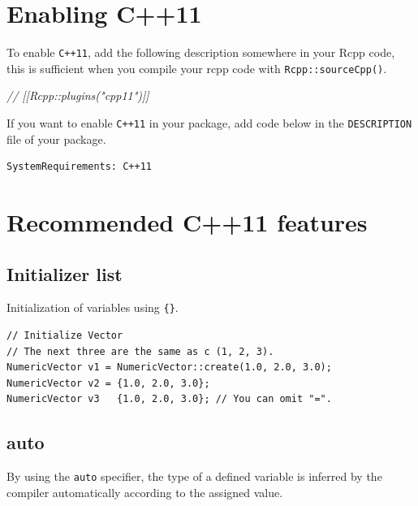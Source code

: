 \documentclass[]{book}
\newenvironment{Shaded}{\begin{snugshade}}{\end{snugshade}}
\newcommand{\CommentTok}[1]{\textcolor[rgb]{0.56,0.35,0.01}{\textit{#1}}}
\begin{document}
\hypertarget{enabling-c11}{%
\section{Enabling C++11}\label{enabling-c11}}

To enable \texttt{C++11}, add the following description somewhere in your Rcpp code, this is sufficient when you compile your rcpp code with \texttt{Rcpp::sourceCpp()}.

\begin{Shaded}
\begin{Highlighting}[]
\CommentTok{// [[Rcpp::plugins("cpp11")]]}
\end{Highlighting}
\end{Shaded}

If you want to enable \texttt{C++11} in your package, add code below in the \texttt{DESCRIPTION} file of your package.

\begin{verbatim}
SystemRequirements: C++11
\end{verbatim}

\hypertarget{recommended-c11-features}{%
\section{Recommended C++11 features}\label{recommended-c11-features}}

\hypertarget{initializer-list}{%
\subsection{Initializer list}\label{initializer-list}}

Initialization of variables using \texttt{\{\}}.

\begin{verbatim}
// Initialize Vector
// The next three are the same as c (1, 2, 3).
NumericVector v1 = NumericVector::create(1.0, 2.0, 3.0);
NumericVector v2 = {1.0, 2.0, 3.0};
NumericVector v3   {1.0, 2.0, 3.0}; // You can omit "=".
\end{verbatim}

\hypertarget{auto}{%
\subsection{auto}\label{auto}}

By using the \texttt{auto} specifier, the type of a defined variable is inferred by the compiler automatically according to the assigned value.
\end{document}
